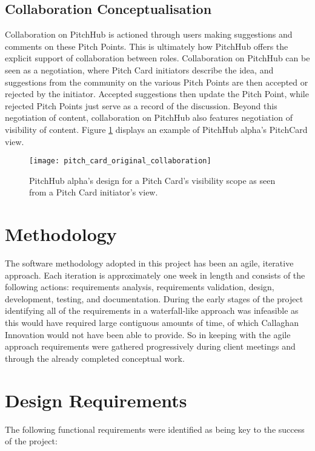 \subsection{Collaboration Conceptualisation}
Collaboration on PitchHub is actioned through users making suggestions and comments on these Pitch Points. This is ultimately how PitchHub offers the explicit support of collaboration between roles. Collaboration on PitchHub can be seen as a negotiation, where Pitch Card initiators describe the idea, and suggestions from the community on the various Pitch Points are then accepted or rejected by the initiator. Accepted suggestions then update the Pitch Point, while rejected Pitch Points just serve as a record of the discussion. Beyond this negotiation of content, collaboration on PitchHub also features negotiation of visibility of content. Figure \ref{fig:pitch_card_original_collaboration} displays an example of PitchHub alpha's PitchCard view.
\begin{figure}[ht]
    \centering
    \texttt{[image: pitch\_card\_original\_collaboration]}
    \caption{PitchHub alpha's design for a Pitch Card's visibility scope as seen from a Pitch Card initiator's view.}
    \label{fig:pitch_card_original_collaboration}
\end{figure}

\section{Methodology}
The software methodology adopted in this project has been an agile, iterative approach. Each iteration is approximately one week in length and consists of the following actions: requirements analysis, requirements validation, design, development, testing, and documentation. During the early stages of the project identifying all of the requirements in a waterfall-like approach was infeasible as this would have required large contiguous amounts of time, of which Callaghan Innovation would not have been able to provide. So in keeping with the agile approach requirements were gathered progressively during client meetings and through the already completed conceptual work. 

\section{Design Requirements}\label{S:designRequirements}
The following functional requirements were identified as being key to the success of the project:

